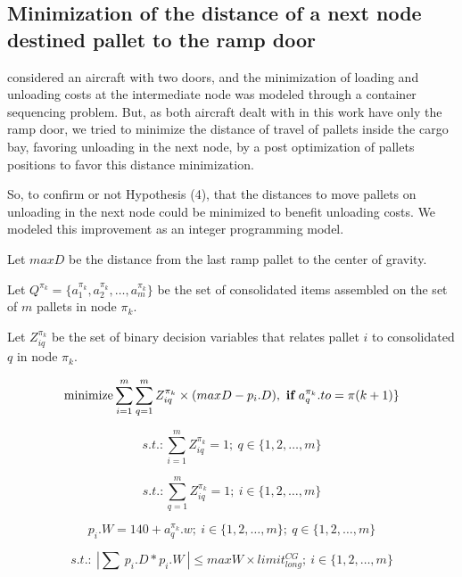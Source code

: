\documentclass[preprint,authoryear]{elsarticle}
\begin{document}
\subsection{Minimization of the distance of a next node destined pallet to the ramp door }

\cite{LurkinSchyns2015} considered an aircraft with two doors, and the minimization of loading and unloading costs at the intermediate node was modeled through a container sequencing problem. But, as both aircraft dealt with in this work have only the ramp door, we tried to minimize the distance of travel of pallets inside the cargo bay, favoring unloading in the next node, by a post optimization of pallets positions to favor this distance minimization.

So, to confirm or not Hypothesis (4), that the distances to move pallets on unloading in the next node could be minimized to benefit unloading costs. We modeled this improvement as an integer programming model.

Let $maxD$ be the distance from the last ramp pallet to the center of gravity.

Let $Q^{\pi_k}  = \{ a^{\pi_k}_1, a^{\pi_k}_2, \ldots, a^{\pi_k}_m \}$ be the set of consolidated items assembled on the set of $m$ pallets in node $\pi_k$.

Let $Z^{\pi_k}_{iq}$ be the set of binary decision variables that relates pallet $i$ to consolidated $q$ in node $\pi_k$.

\begin{equation} \label{eq:distobj}
	\mbox{minimize} \sum_{i=1}^m \sum_{q=1}^m Z^{\pi_k}_{iq} \times ( maxD - p_i.D) ,\ \mbox{{\bf if}}\ a^{\pi_k}_q.to = \pi(k+1) \}
\end{equation}

\begin{equation} \label{eq:distcons}
	s.t.: \sum_{i=1}^m Z^{\pi_k}_{iq} = 1;\ q \in \{1,2,\ldots,m\}
\end{equation}

\begin{equation} \label{eq:distpallets}
	s.t.: \sum_{q=1}^{m} Z^{\pi_k}_{iq}=1;\ i \in \{1,2,\ldots,m\}
\end{equation}

\begin{equation} \label{eq:distpalletw}
	p_i.W = 140 + a^{\pi_k}_q.w ;\ i \in \{1,2,\ldots,m\};\ q \in \{1,2,\ldots,m\}
\end{equation}

\begin{equation} \label{eq:disttorque}
	s.t.:\ | \sum\ p_i.D * p_i.W\ | \leq maxW \times limit^{CG}_{long} ;\ i \in \{1,2,\ldots,m\}
\end{equation}
\end{document}
